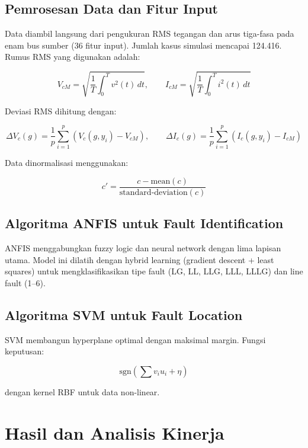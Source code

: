 \documentclass{article}
\begin{document}
\subsection{Pemrosesan Data dan Fitur Input}
Data diambil langsung dari pengukuran RMS tegangan dan arus tiga-fasa pada enam bus sumber (36 fitur input). Jumlah kasus simulasi mencapai 124.416. Rumus RMS yang digunakan adalah:

\begin{equation}
V_{cM} = \sqrt{\frac{1}{T} \int_{0}^{T} v^2(t)\, dt}, \qquad
I_{cM} = \sqrt{\frac{1}{T} \int_{0}^{T} i^2(t)\, dt}
\end{equation}

Deviasi RMS dihitung dengan:

\begin{equation}
\Delta V_c(g) = \frac{1}{p} \sum_{i=1}^{p} \left( V_c(g, y_i) - V_{cM} \right), \qquad
\Delta I_c(g) = \frac{1}{p} \sum_{i=1}^{p} \left( I_c(g, y_i) - I_{cM} \right)
\end{equation}

Data dinormalisasi menggunakan:

\begin{equation}
c' = \frac{c - \text{mean}(c)}{\text{standard-deviation}(c)}
\end{equation}

\subsection{Algoritma ANFIS untuk Fault Identification}
ANFIS menggabungkan fuzzy logic dan neural network dengan lima lapisan utama. Model ini dilatih dengan hybrid learning (gradient descent + least squares) untuk mengklasifikasikan tipe fault (LG, LL, LLG, LLL, LLLG) dan line fault (1--6).

\subsection{Algoritma SVM untuk Fault Location}
SVM membangun hyperplane optimal dengan maksimal margin. Fungsi keputusan:

\begin{equation}
\text{sgn} \left( \sum v_i u_i + \eta \right)
\end{equation}

dengan kernel RBF untuk data non-linear.

\section{Hasil dan Analisis Kinerja}
\end{document}
